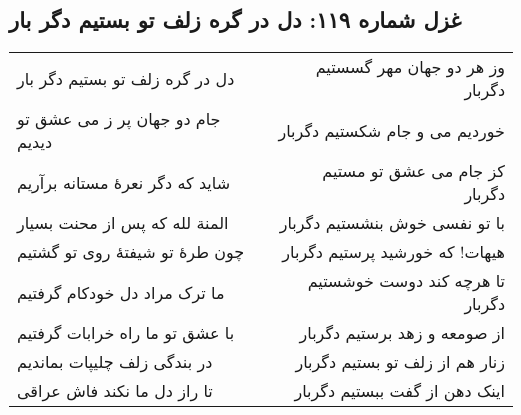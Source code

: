 \begin{center}
\section*{غزل شماره ۱۱۹: دل در گره زلف تو بستیم دگر بار}
\label{sec:119}
\begin{longtable}{l p{0.5cm} r}
دل در گره زلف تو بستیم دگر بار
&&
وز هر دو جهان مهر گسستیم دگربار
\\
جام دو جهان پر ز می عشق تو دیدیم
&&
خوردیم می و جام شکستیم دگربار
\\
شاید که دگر نعرهٔ مستانه برآریم
&&
کز جام می عشق تو مستیم دگربار
\\
المنة لله که پس از محنت بسیار
&&
با تو نفسی خوش بنشستیم دگربار
\\
چون طرهٔ تو شیفتهٔ روی تو گشتیم
&&
هیهات! که خورشید پرستیم دگربار
\\
ما ترک مراد دل خودکام گرفتیم
&&
تا هرچه کند دوست خوشستیم دگربار
\\
با عشق تو ما راه خرابات گرفتیم
&&
از صومعه و زهد برستیم دگربار
\\
در بندگی زلف چلیپات بماندیم
&&
زنار هم از زلف تو بستیم دگربار
\\
تا راز دل ما نکند فاش عراقی
&&
اینک دهن از گفت ببستیم دگربار
\\
\end{longtable}
\end{center}
